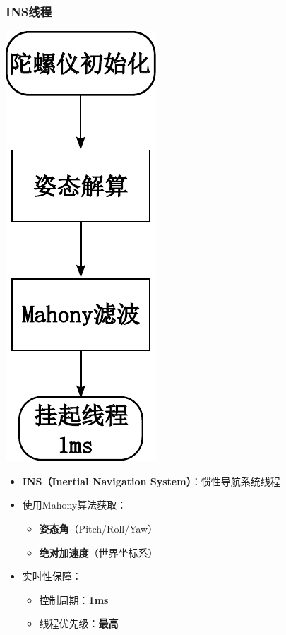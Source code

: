 \documentclass{beamer}
\begin{document}
\begin{frame}
	\frametitle{INS线程}
	
	\begin{minipage}[t]{0.5\linewidth}
		\vspace{-\baselineskip} %
		\centering
		\includegraphics[width=0.4\linewidth]{img/chapter5/ins} %
	\end{minipage}%
	\hfill %
	\begin{minipage}[t]{0.4\linewidth}

		\begin{itemize}
			\item \textbf{INS（Inertial Navigation System）}：惯性导航系统线程
			\item 使用Mahony算法获取：
			\begin{itemize}
				\item \textbf{姿态角}（Pitch/Roll/Yaw）
				\item \textbf{绝对加速度}（世界坐标系）
			\end{itemize}
			\item 实时性保障：
			\begin{itemize}
				\item 控制周期：\textbf{1ms}
				\item 线程优先级：\textbf{最高}
			\end{itemize}
		\end{itemize}
	\end{minipage}
\end{frame}
	
\end{document}
